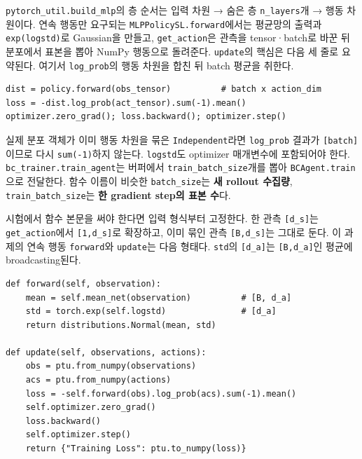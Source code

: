 \documentclass[11pt,a4paper]{article}
\begin{document}
\texttt{pytorch\_\allowbreak{}util.\allowbreak{}build\_\allowbreak{}mlp}의 층 순서는 입력 차원 → 숨은 층 \texttt{n\_\allowbreak{}layers}개 → 행동 차원이다. 연속 행동만 요구되는 \texttt{MLPPolicySL.\allowbreak{}forward}에서는 평균망의 출력과 \texttt{exp(logstd)}로 Gaussian을 만들고, \texttt{get\_\allowbreak{}action}은 관측을 tensor·batch로 바꾼 뒤 분포에서 표본을 뽑아 NumPy 행동으로 돌려준다. \texttt{update}의 핵심은 다음 세 줄로 요약된다. 여기서 \texttt{log\_\allowbreak{}prob}의 행동 차원을 합친 뒤 batch 평균을 취한다.\par

\begin{verbatim}
dist = policy.forward(obs_tensor)          # batch x action_dim
loss = -dist.log_prob(act_tensor).sum(-1).mean()
optimizer.zero_grad(); loss.backward(); optimizer.step()
\end{verbatim}

실제 분포 객체가 이미 행동 차원을 묶은 \texttt{Independent}라면 \texttt{log\_\allowbreak{}prob} 결과가 \texttt{[batch]}이므로 다시 \texttt{sum(-1)}하지 않는다. \texttt{logstd}도 optimizer 매개변수에 포함되어야 한다. \texttt{bc\_\allowbreak{}trainer.\allowbreak{}train\_\allowbreak{}agent}는 버퍼에서 \texttt{train\_\allowbreak{}batch\_\allowbreak{}size}개를 뽑아 \texttt{BCAgent.\allowbreak{}train}으로 전달한다. 함수 이름이 비슷한 \texttt{batch\_\allowbreak{}size}는 \textbf{새 rollout 수집량}, \texttt{train\_\allowbreak{}batch\_\allowbreak{}size}는 \textbf{한 gradient step의 표본 수}다.\par

시험에서 함수 본문을 써야 한다면 입력 형식부터 고정한다. 한 관측 \texttt{[d\_\allowbreak{}s]}는 \texttt{get\_\allowbreak{}action}에서 \texttt{[1,\allowbreak{}d\_\allowbreak{}s]}로 확장하고, 이미 묶인 관측 \texttt{[B,\allowbreak{}d\_\allowbreak{}s]}는 그대로 둔다. 이 과제의 연속 행동 \texttt{forward}와 \texttt{update}는 다음 형태다. \texttt{std}의 \texttt{[d\_\allowbreak{}a]}는 \texttt{[B,\allowbreak{}d\_\allowbreak{}a]}인 평균에 broadcasting된다.\par

\begin{verbatim}
def forward(self, observation):
    mean = self.mean_net(observation)          # [B, d_a]
    std = torch.exp(self.logstd)               # [d_a]
    return distributions.Normal(mean, std)

def update(self, observations, actions):
    obs = ptu.from_numpy(observations)
    acs = ptu.from_numpy(actions)
    loss = -self.forward(obs).log_prob(acs).sum(-1).mean()
    self.optimizer.zero_grad()
    loss.backward()
    self.optimizer.step()
    return {"Training Loss": ptu.to_numpy(loss)}
\end{verbatim}
\end{document}

